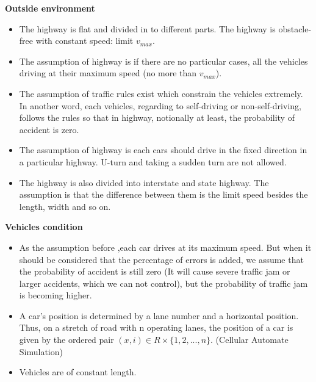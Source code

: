 \documentclass{mcmthesis}
\numberwithin{equation}{section}
\begin{document}
		\textbf{Outside environment}
			\begin{itemize}
				\item The highway is flat and divided in to different parts. The highway is obstacle-free with constant speed: limit $v_{max}$.

				\item The assumption of highway is if there are no particular cases, all the vehicles driving at their maximum speed (no more than $v_{max}$).

				\item The assumption of traffic rules exist which constrain the vehicles extremely. In another word, each vehicles, regarding to self-driving or non-self-driving, follows the rules so that in highway, notionally at least, the probability of accident is zero.

				\item The assumption of highway is each cars should drive in the fixed direction in a particular highway. U-turn and taking a sudden turn are not allowed.

				\item The highway is also divided into interstate and state highway. The assumption is that the difference between them is the limit speed besides the length, width and so on.
			\end{itemize}

		\textbf{Vehicles condition}
			\begin{itemize}
				\item As the assumption before ,each car drives at its maximum speed. But when it should be considered that the percentage of errors is added, we assume that the probability of accident is still zero (It will cause severe traffic jam or larger accidents, which we can not control), but the probability of traffic jam is becoming higher.

				\item A car’s position is determined by a lane number and a horizontal position. Thus, on a stretch of road with n operating lanes, the position of a car is given by the ordered pair $(x, i)\in R \times \{1, 2, . . . , n\}$. (Cellular Automate Simulation)

				\item Vehicles are of constant length.
			\end{itemize}
\end{document}
